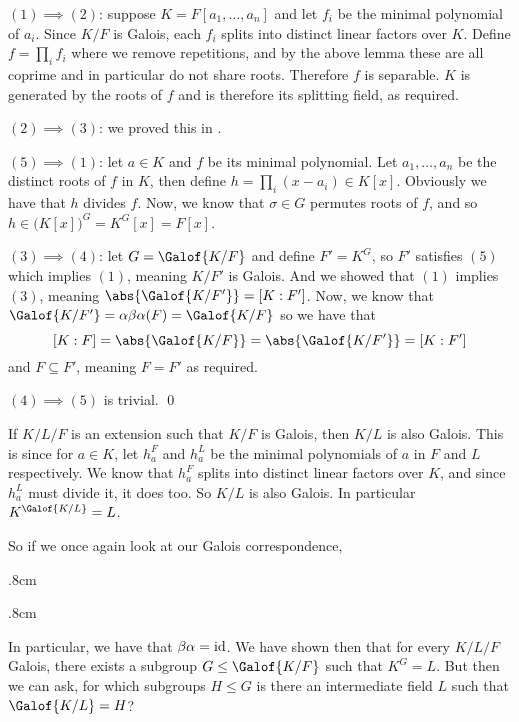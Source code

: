 \Proof $(1)\implies(2)$: suppose $K=F[a_1,\dots,a_n]$ and let $f_i$ be the minimal polynomial of $a_i$.
Since $K/F$ is Galois, each $f_i$ splits into distinct linear factors over $K$.
Define $f=\prod_if_i$ where we remove repetitions, and by the above lemma these are all coprime and in particular do not share roots.
Therefore $f$ is separable.
$K$ is generated by the roots of $f$ and is therefore its splitting field, as required.

$(2)\implies(3)$: we proved this in .

$(5)\implies(1)$: let $a\in K$ and $f$ be its minimal polynomial.
Let $a_1,\dots,a_n$ be the distinct roots of $f$ in $K$, then define $h=\prod_i(x-a_i)\in K[x]$.
Obviously we have that $h$ divides $f$.
Now, we know that $\sigma\in G$ permutes roots of $f$, and so $h\in\bigl(K[x]\bigr)^G=K^G[x]=F[x]$.

$(3)\implies(4)$: let $G=\Galof{K/F}$ and define $F'=K^G$, so $F'$ satisfies $(5)$ which implies $(1)$, meaning $K/F'$ is Galois.
And we showed that $(1)$ implies $(3)$, meaning $\abs{\Galof{K/F'}}=[K:F']$.
Now, we know that $\Galof{K/F'}=\alpha\beta\alpha(F)=\Galof{K/F}$ so we have that
$$ [K:F] = \abs{\Galof{K/F}} = \abs{\Galof{K/F'}} = [K:F'] $$
and $F\subseteq F'$, meaning $F=F'$ as required.

$(4)\implies(5)$ is trivial.
\qed

If $K/L/F$ is an extension such that $K/F$ is Galois, then $K/L$ is also Galois.
This is since for $a\in K$, let $h_a^F$ and $h_a^L$ be the minimal polynomials of $a$ in $F$ and $L$ respectively.
We know that $h_a^F$ splits into distinct linear factors over $K$, and since $h_a^L$ must divide it, it does too.
So $K/L$ is also Galois.
In particular $K^{\Galof{K/L}}=L$.

So if we once again look at our Galois correspondence,

\kern.8cm
\centerline{}
\kern.8cm

In particular, we have that $\beta\alpha={\rm id}$.
We have shown then that for every $K/L/F$ Galois, there exists a subgroup $G\leq\Galof{K/F}$ such that $K^G=L$.
But then we can ask, for which subgroups $H\leq G$ is there an intermediate field $L$ such that $\Galof{K/L}=H$?


